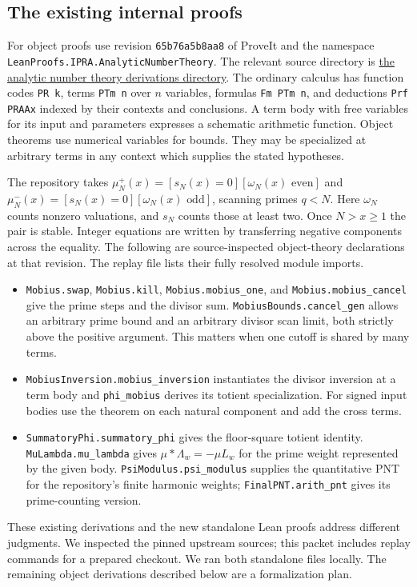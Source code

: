 \subsection{The existing internal proofs}
For object proofs use revision \texttt{65b76a5b8aa8} of ProveIt and the
namespace \texttt{LeanProofs.}\allowbreak\texttt{IPRA.}\allowbreak\texttt{AnalyticNumberTheory}. The relevant
source directory is
\href{https://github.com/VladimirReshetnikov/ProveIt/tree/65b76a5b8aa87ecad4103c2d287eff5660d3c84c/Logic/PrimitiveRecursiveArithmetic/Derivations/Lean/IPRADerivations/AnalyticNumberTheory}{the analytic number theory derivations directory}.
The ordinary calculus has function codes \texttt{PR k}, terms
\texttt{PTm n} over $n$ variables, formulas \texttt{Fm PTm n}, and
deductions \texttt{Prf PRAAx} indexed by their contexts and conclusions.
A term body with free variables for its input and parameters expresses a
schematic arithmetic function. Object theorems use numerical variables
for bounds. They may be specialized at arbitrary terms in any context
which supplies the stated hypotheses.

The repository takes $\mu_N^+(x)=[s_N(x)=0][\omega_N(x)\text{ even}]$ and
$\mu_N^-(x)=[s_N(x)=0][\omega_N(x)\text{ odd}]$, scanning primes $q<N$.
Here $\omega_N$ counts nonzero valuations, and $s_N$ counts those at
least two. Once $N>x\ge1$ the pair is stable. Integer equations are
written by transferring negative components across the equality.
The following are source-inspected object-theory declarations at that
revision. The replay file lists their fully resolved module imports.
\begin{itemize}
\item \texttt{Mobius.swap}, \texttt{Mobius.kill},
\texttt{Mobius.mobius\_one}, and \texttt{Mobius.mobius\_cancel} give
the prime steps and the divisor sum. \texttt{MobiusBounds.cancel\_gen}
allows an arbitrary prime bound and an arbitrary divisor scan limit,
both strictly above the positive argument. This matters when one cutoff
is shared by many terms.
\item \texttt{MobiusInversion.mobius\_inversion} instantiates the divisor
inversion at a term body and \texttt{phi\_mobius} derives its totient
specialization. For signed input bodies use the theorem on each natural
component and add the cross terms.
\item \texttt{SummatoryPhi.summatory\_phi} gives the floor-square
totient identity. \texttt{MuLambda.mu\_lambda} gives
$\mu*\Lambda_w=-\mu L_w$ for the prime weight represented by the
given body. \texttt{PsiModulus.}\allowbreak\texttt{psi\_modulus} supplies the quantitative
PNT for the repository's finite harmonic weights; \texttt{FinalPNT.}\allowbreak\texttt{arith\_pnt}
gives its prime-counting version.
\end{itemize}
These existing derivations and the new standalone Lean proofs address
different judgments. We inspected the pinned upstream sources; this
packet includes replay commands for a prepared checkout. We ran both
standalone files locally. The remaining object derivations described below
are a formalization plan.

